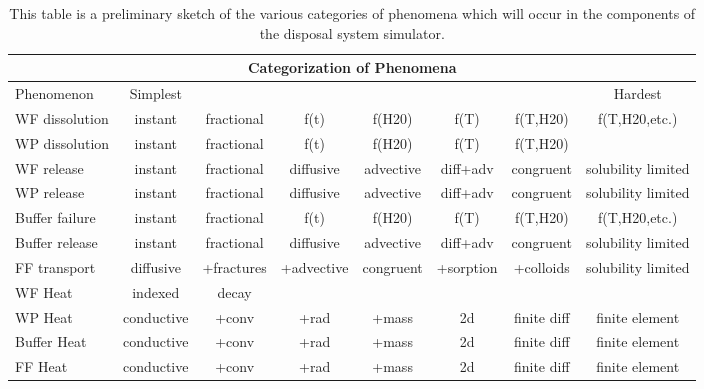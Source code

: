 %
\begin{table}
  \centering
  \footnotesize{
  \begin{tabularx}{\textwidth}{|l|c|c|c|c|c|c|c|}
    \multicolumn{8}{c}{\textbf{Categorization of Phenomena}}\\
    \hline
     Phenomenon&Simplest&&&&&&Hardest\\
    \hline
     WF dissolution&instant&fractional&f(t)&f(H20)&f(T)&f(T,H20)&f(T,H20,etc.)\\
     WP dissolution&instant&fractional&f(t)&f(H20)&f(T)&f(T,H20)&\\
     WF release&instant&fractional&diffusive&advective&diff+adv&congruent&solubility limited\\
     WP release&instant&fractional&diffusive&advective&diff+adv&congruent&solubility limited\\
     Buffer failure&instant&fractional&f(t)&f(H20)&f(T)&f(T,H20)&f(T,H20,etc.)\\
     Buffer release &instant&fractional&diffusive&advective&diff+adv&congruent&solubility limited\\
     FF transport &diffusive&+fractures&+advective&congruent&+sorption&+colloids&solubility limited\\
     WF Heat&indexed&decay&&&&&\\
     WP Heat&conductive&+conv&+rad&+mass&2d&finite diff&finite element\\
     Buffer Heat&conductive&+conv&+rad&+mass&2d&finite diff&finite element\\
     FF Heat&conductive&+conv&+rad&+mass&2d&finite diff&finite element\\
    \hline
  \end{tabularx}
  \caption[Categorization of Phenomena]{This table is a preliminary sketch of 
  the various categories of phenomena which will occur in the components of the  
  disposal system simulator.}
  \label{tab:cat}
  }
\end{table}


